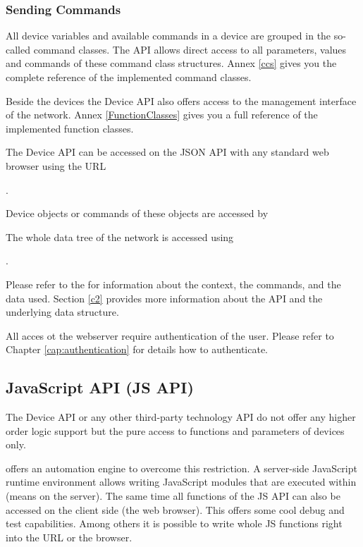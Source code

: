 \subsubsection {Sending \zwave Commands}

All device variables and available commands in a \zwave device are grouped in the so-called 
command classes. The \zwave API allows direct access to all parameters, values and commands 
of these command class structures. Annex \ref{ccs} gives you the complete reference of 
the implemented command classes.

Beside the devices the \zwave Device API also offers access to the management interface of 
the network. Annex \ref{FunctionClasses} gives you a full reference of the implemented 
function classes.

The \zwave Device API can be accessed on the JSON API with any standard web browser using the URL

.

Device objects or commands of these objects are accessed by




The whole data tree of the \zwave network is accessed using


.

Please refer to the \zway for information about the context, the 
commands, and the data used. Section \ref{c2} provides more information
about the API and the underlying data structure.

All acces ot the webserver require authentication of the user. Please refer to Chapter 
\ref{cap:authentication} for details how to authenticate.

\subsection{JavaScript API (JS API)}

The \zwave Device API or any other third-party technology API do not offer any higher order
logic support but the pure access to functions and parameters of devices only.

\zway offers an automation engine to overcome this restriction. A server-side JavaScript 
runtime environment allows writing JavaScript modules that are executed within \zway 
(means on the server). The same time all functions of the JS API can also be accessed on 
the client side (the web browser). This offers some cool debug and test capabilities. 
Among others it is possible to write whole JS functions right into the URL or the browser.

